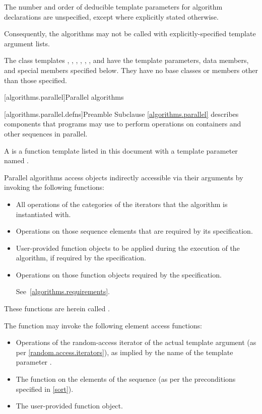 \pnum
The number and order of deducible template parameters for algorithm declarations
are unspecified, except where explicitly stated otherwise.
\begin{note}
Consequently, the algorithms may not
be called with explicitly-specified template argument lists.
\end{note}

\pnum
The class templates
,
,
,
,
,
, and
have the template parameters, data members, and special members specified below.
They have no base classes or members other than those specified.

[algorithms.parallel]{Parallel algorithms}

[algorithms.parallel.defns]{Preamble}
\pnum
Subclause \ref{algorithms.parallel} describes components that \Cpp{} programs may use
to perform operations on containers and other sequences in parallel.

\pnum
A  is a function template listed in this document
with a template parameter named .

\pnum
Parallel algorithms access objects indirectly accessible via their arguments
by invoking the following functions:
\begin{itemize}
\item
  All operations of the categories of the iterators
  that the algorithm is instantiated with.
\item
  Operations on those sequence elements that are required by its specification.
\item
  User-provided function objects
  to be applied during the execution of the algorithm,
  if required by the specification.
\item
  Operations on those function objects required by the specification.
\begin{note}
See~\ref{algorithms.requirements}.
\end{note}
\end{itemize}
These functions are herein called .
\begin{example}
The  function may invoke the following element access functions:
\begin{itemize}
\item
  Operations of the random-access iterator of the actual template argument
  (as per \ref{random.access.iterators}),
  as implied by the name of the template parameter .
\item
  The  function on the elements of the sequence
  (as per the preconditions specified in \ref{sort}).
\item
  The user-provided  function object.
\end{itemize}
\end{example}

